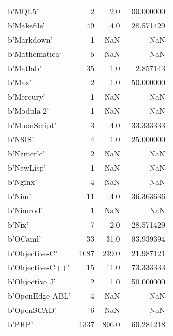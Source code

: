 \begin{table}
\begin{tabular}{lrrr}
b'MQL5'                     &               2 &       2.0 &     100.000000 \\
b'Makefile'                 &              49 &      14.0 &      28.571429 \\
b'Markdown'                 &               1 &       NaN &            NaN \\
b'Mathematica'              &               5 &       NaN &            NaN \\
b'Matlab'                   &              35 &       1.0 &       2.857143 \\
b'Max'                      &               2 &       1.0 &      50.000000 \\
b'Mercury'                  &               1 &       NaN &            NaN \\
b'Modula-2'                 &               1 &       NaN &            NaN \\
b'MoonScript'               &               3 &       4.0 &     133.333333 \\
b'NSIS'                     &               4 &       1.0 &      25.000000 \\
b'Nemerle'                  &               2 &       NaN &            NaN \\
b'NewLisp'                  &               1 &       NaN &            NaN \\
b'Nginx'                    &               4 &       NaN &            NaN \\
b'Nim'                      &              11 &       4.0 &      36.363636 \\
b'Nimrod'                   &               1 &       NaN &            NaN \\
b'Nix'                      &               7 &       2.0 &      28.571429 \\
b'OCaml'                    &              33 &      31.0 &      93.939394 \\
b'Objective-C'              &            1087 &     239.0 &      21.987121 \\
b'Objective-C++'            &              15 &      11.0 &      73.333333 \\
b'Objective-J'              &               2 &       1.0 &      50.000000 \\
b'OpenEdge ABL'             &               4 &       NaN &            NaN \\
b'OpenSCAD'                 &               6 &       NaN &            NaN \\
b'PHP'                      &            1337 &     806.0 &      60.284218 \\

\end{tabular}
\end{table}
